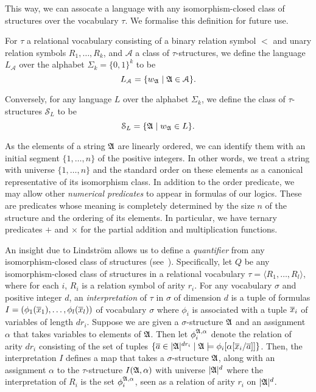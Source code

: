 \documentclass[a4paper,UKenglish,cleveref, autoref, thm-restate, anonymous]{lipics-v2021}
\begin{document}
This way, we can assocate a language with any isomorphism-closed class of structures over the vocabulary $\tau$.  We formalise this definition for future use.
\begin{definition}\label{def:associated-lang}
  For $\tau$ a relational vocabulary consisting of a binary relation symbol $<$ and unary relation symbols $R_1,\ldots,R_k$, and $\mathcal{A}$ a class of $\tau$-structures, we define the language $L_{\mathcal{A}}$ over the alphabet $\Sigma_k = \{0,1\}^k$ to be
  $$L_{\mathcal{A}} = \{ w_{\mathfrak{A}} \mid \mathfrak{A} \in \mathcal{A} \}.$$

  Conversely, for any language $L$ over the alphabet $\Sigma_k$, we define the class of $\tau$-structures $\mathcal{S}_L$ to be
  $$\mathcal{S}_L = \{ \mathfrak{A} \mid w_{\mathfrak{A}} \in L \}.$$
\end{definition}

As the elements of a string $\mathfrak{A}$ are linearly ordered, we can identify them with an initial segment $\{1,\ldots,n\}$ of the positive integers.  In other words, we treat a string with universe $\{1,\ldots,n\}$ and the standard order on these elements as a canonical representative of its isomorphism class.  In addition to the order predicate, we may allow other \emph{numerical predicates} to appear in formulas of our logics.  These are predicates whose meaning is completely determined by the size $n$ of the structure and the ordering of its elements.  In particular, we have ternary predicates $+$ and $\times$ for the partial addition and multiplication functions.

An insight due to Lindstr\"om allows us to define a \emph{quantifier} from any isomorphism-closed class of structures (see~\cite{Ebb85}).  Specifically, let $Q$ be any isomorphism-closed class of structures in a relational vocabulary $\tau = \langle R_1,\ldots,R_l\rangle$, where for each $i$, $R_i$ is a relation symbol of arity $r_i$.  For any vocabulary $\sigma$ and positive integer $d$, an \emph{interpretation} of $\tau$ in $\sigma$ of dimension $d$ is a tuple of formulas $I = (\phi_1(\overline{x}_1),\dots, \phi_l(\overline{x}_l))$ of vocabulary $\sigma$ where $\phi_i$ is associated with a tuple $\overline{x}_i$ of variables of length $dr_i$.  Suppose we are given a $\sigma$-structure $\mathfrak{A}$ and an assignment $\alpha$ that takes variables to elements of $\mathfrak{A}$.  Then let $\phi_i^{\mathfrak{A},\alpha}$ denote the relation of arity $dr_i$ consisting of the set of tuples $\{\overline{a} \in |\mathfrak{A}|^{dr_i} \mid \mathfrak{A} \models \phi_i[\alpha[\overline{x}_i/\overline{a}]] \}$.  Then, the interpretation $I$ defines a map that takes a $\sigma$-structure $\mathfrak{A}$, along with an assignment $\alpha$ to the  $\tau$-structure $I(\mathfrak{A},\alpha)$ with universe $|\mathfrak{A}|^d$ where the interpretation of $R_i$ is the set $\phi_i^{\mathfrak{A},\alpha}$, seen as a relation of arity $r_i$ on $|\mathfrak{A}|^d$.
\end{document}
